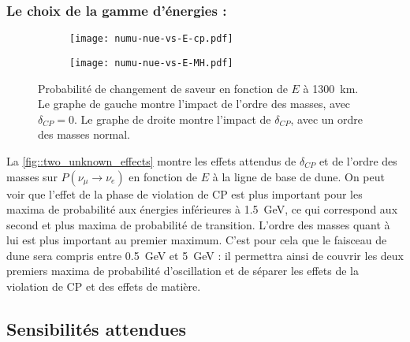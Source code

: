       \subsubsection{Le choix de la gamme d'énergies :}

        \begin{figure}[htpb]
          \begin{subfigure}[t]{0.49\textwidth}
            \texttt{[image: numu-nue-vs-E-cp.pdf]}
          \end{subfigure}\hfill
          \begin{subfigure}[t]{0.49\textwidth}
            \texttt{[image: numu-nue-vs-E-MH.pdf]}
          \end{subfigure}
            \caption[Probabilité de changement de saveur en fonction de $E$ à \SI{1300}{\kilo\meter}]{\label{fig::two_unknown_effects}Probabilité de changement de saveur en fonction de $E$ à \SI{1300}{\kilo\meter}. Le graphe de gauche montre l'impact de l'ordre des masses, avec $\delta_{CP}=0$. Le graphe de droite montre l'impact de $\delta_{CP}$, avec un ordre des masses normal.}
        \end{figure}
        La \autoref{fig::two_unknown_effects} montre les effets attendus de $\delta_{CP}$ et de l'ordre des masses sur $P(\nu_{\mu}\to\nu_e)$ en fonction de $E$ à la ligne de base de \gls{dune}. On peut voir que l'effet de la phase de violation de CP est plus important pour les maxima de probabilité aux énergies inférieures à \SI{1.5}{\giga\electronvolt}, ce qui correspond aux second et plus maxima de probabilité de transition. L'ordre des masses quant à lui est plus important au premier maximum. C'est pour cela que le faisceau de \gls{dune} sera compris entre  \SI{0.5}{\giga\electronvolt} et \SI{5}{\giga\electronvolt} : il permettra ainsi de couvrir les deux premiers maxima de probabilité d'oscillation et de séparer les effets de la violation de CP et des effets de matière.


    \subsection{Sensibilités attendues}\label{sec::sensibility}

